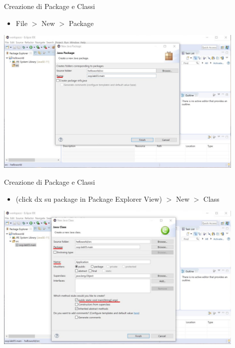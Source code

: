\documentclass[xcolor=dvipsnames,presentation]{beamer}
\begin{document}
\begin{frame}{Creazione di Package e Classi}
\begin{itemize}
\item File $>$ New $>$ Package
\end{itemize}
\begin{center}
\includegraphics[width=0.9\textwidth]{img/eclipse-screenshots/eclipse-ide-02c.jpg}
\end{center}
\end{frame}

\begin{frame}{Creazione di Package e Classi}
\begin{itemize}
\item (click dx su package in Package Explorer View) $>$ New $>$ Class
\end{itemize}
\begin{center}
\includegraphics[width=0.9\textwidth]{img/eclipse-screenshots/eclipse-ide-02d.jpg}
\end{center}
\end{frame}
\end{document}
